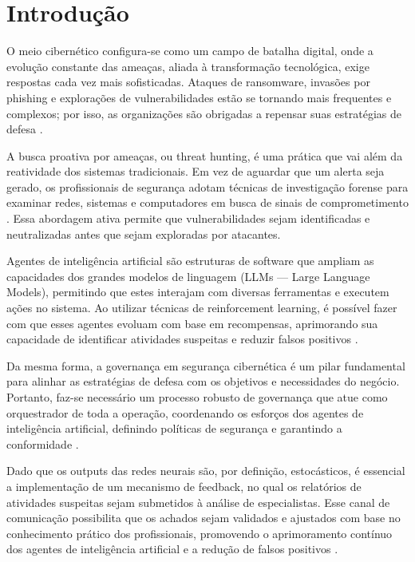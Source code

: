 \documentclass[article,12pt,a4paper]{abntex2}
\begin{document}
\renewcommand{\baselinestretch}{1.2}\normalsize

\imprimircapa

\textual
\section{Introdução}
O meio cibernético configura-se como um campo de batalha digital, onde a evolução constante das ameaças, aliada à transformação tecnológica, exige respostas cada vez mais sofisticadas. Ataques de ransomware, invasões por phishing e explorações de vulnerabilidades estão se tornando mais frequentes e complexos; por isso, as organizações são obrigadas a repensar suas estratégias de defesa \cite{academia20}.

A busca proativa por ameaças, ou threat hunting, é uma prática que vai além da reatividade dos sistemas tradicionais. Em vez de aguardar que um alerta seja gerado, os profissionais de segurança adotam técnicas de investigação forense para examinar redes, sistemas e computadores em busca de sinais de comprometimento \cite{academia22}. Essa abordagem ativa permite que vulnerabilidades sejam identificadas e neutralizadas antes que sejam exploradas por atacantes.

Agentes de inteligência artificial são estruturas de software que ampliam as capacidades dos grandes modelos de linguagem (LLMs — Large Language Models), permitindo que estes interajam com diversas ferramentas e executem ações no sistema. Ao utilizar técnicas de reinforcement learning, é possível fazer com que esses agentes evoluam com base em recompensas, aprimorando sua capacidade de identificar atividades suspeitas e reduzir falsos positivos \cite{academia20}.

Da mesma forma, a governança em segurança cibernética é um pilar fundamental para alinhar as estratégias de defesa com os objetivos e necessidades do negócio. Portanto, faz-se necessário um processo robusto de governança que atue como orquestrador de toda a operação, coordenando os esforços dos agentes de inteligência artificial, definindo políticas de segurança e garantindo a conformidade \cite{academia21}.

Dado que os outputs das redes neurais são, por definição, estocásticos, é essencial a implementação de um mecanismo de feedback, no qual os relatórios de atividades suspeitas sejam submetidos à análise de especialistas. Esse canal de comunicação possibilita que os achados sejam validados e ajustados com base no conhecimento prático dos profissionais, promovendo o aprimoramento contínuo dos agentes de inteligência artificial e a redução de falsos positivos \cite{academia22}.
\end{document}
